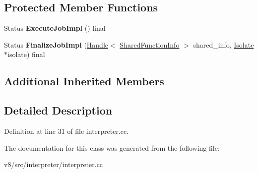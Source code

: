 \subsection*{Protected Member Functions}
\begin{DoxyCompactItemize}
\item 
\mbox{\label{classv8_1_1internal_1_1interpreter_1_1InterpreterCompilationJob_a4f7165efd148dd70101e76da00bd192d}} 
Status {\bfseries Execute\+Job\+Impl} () final
\item 
\mbox{\label{classv8_1_1internal_1_1interpreter_1_1InterpreterCompilationJob_a00a0e2f3794ccd1930252a745eec6f0d}} 
Status {\bfseries Finalize\+Job\+Impl} (\mbox{\hyperlink{classv8_1_1internal_1_1Handle}{Handle}}$<$ \mbox{\hyperlink{classv8_1_1internal_1_1SharedFunctionInfo}{Shared\+Function\+Info}} $>$ shared\+\_\+info, \mbox{\hyperlink{classv8_1_1internal_1_1Isolate}{Isolate}} $\ast$isolate) final
\end{DoxyCompactItemize}
\subsection*{Additional Inherited Members}


\subsection{Detailed Description}


Definition at line 31 of file interpreter.\+cc.



The documentation for this class was generated from the following file\+:\begin{DoxyCompactItemize}
\item 
v8/src/interpreter/interpreter.\+cc\end{DoxyCompactItemize}
